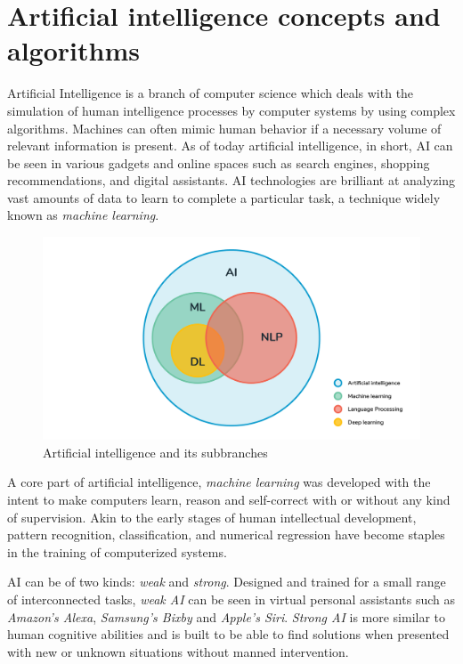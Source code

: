 \documentclass{report}
\begin{document}
\newpage

\chapter {Artificial intelligence concepts and algorithms}

Artificial Intelligence is a branch of computer science which deals with the simulation of human intelligence processes by computer systems by using complex algorithms. Machines can often mimic human behavior if a necessary volume of relevant information is present. As of today artificial intelligence, in short, AI can be seen in various gadgets and online spaces such as search engines, shopping recommendations, and digital assistants. AI technologies are brilliant at analyzing vast amounts of data to learn to complete a particular task, a technique widely known as \textit{machine learning}. \par

\begin{figure}[b]
\centerline{\includegraphics[scale=0.16]{ai}}
\caption {Artificial intelligence and its subbranches}
\end{figure}

A core part of artificial intelligence, \textit{machine learning} was developed with the intent to make computers learn, reason and self-correct with or without any kind of supervision. Akin to the early stages of human intellectual development, pattern recognition, classification, and numerical regression have become staples in the training of computerized systems. \par

AI can be of two kinds: \textit{weak} and \textit{strong}. Designed and trained for a small range of interconnected tasks, \textit{weak AI} can be seen in virtual personal assistants such as \textit{Amazon's Alexa}, \textit{Samsung's Bixby} and \textit{Apple's Siri}. \textit{Strong AI} is more similar to human cognitive abilities and is built to be able to find solutions when presented with new or unknown situations without manned intervention.\par
\end{document}
